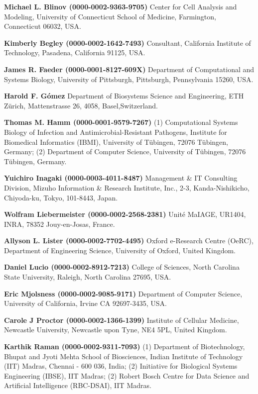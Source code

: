 \documentclass{sbml-paper}
\begin{document}
\textbf{Michael L. Blinov (0000-0002-9363-9705)} Center for Cell Analysis and Modeling, University of Connecticut School of Medicine, Farmington, Connecticut 06032, USA.

\textbf{Kimberly Begley (0000-0002-1642-7493)} Consultant, California Institute of Technology, Pasadena, California 91125, USA.

\textbf{James R. Faeder (0000-0001-8127-609X)} Department of Computational and Systems Biology, University of Pittsburgh, Pittsburgh, Pennsylvania 15260, USA.

\textbf{Harold F. Gómez} Department of Biosystems Science and Engineering, ETH Zürich, Mattenstrasse 26, 4058, Basel,Switzerland.

\textbf{Thomas M. Hamm (0000-0001-9579-7267)} (1) Computational Systems Biology of Infection and Antimicrobial-Resistant Pathogens, Institute for Biomedical Informatics (IBMI), University of Tübingen, 72076 Tübingen, Germany; (2) Department of Computer Science, University of Tübingen, 72076 Tübingen, Germany.

\textbf{Yuichiro Inagaki (0000-0003-4011-8487)} Management & IT Consulting Division, Mizuho Information & Research Institute, Inc., 2-3, Kanda-Nishikicho, Chiyoda-ku, Tokyo, 101-8443, Japan.

\textbf{Wolfram Liebermeister (0000-0002-2568-2381)} Unité MaIAGE, UR1404, INRA, 78352 Jouy-en-Josas, France.

\textbf{Allyson L. Lister (0000-0002-7702-4495)} Oxford e-Research Centre (OeRC), Department of Engineering Science, University of Oxford, United Kingdom.

\textbf{Daniel Lucio (0000-0002-8912-7213)} College of Sciences, North Carolina State University, Raleigh, North Carolina 27695, USA.

\textbf{Eric Mjolsness (0000-0002-9085-9171)} Department of Computer Science, University of California, Irvine CA 92697-3435, USA.

\textbf{Carole J Proctor (0000-0002-1366-1399)} Institute of Cellular Medicine, Newcastle University, Newcastle upon Tyne, NE4 5PL, United Kingdom.

\textbf{Karthik Raman (0000-0002-9311-7093)} (1) Department of Biotechnology, Bhupat and Jyoti Mehta School of Biosciences, Indian Institute of Technology (IIT) Madras, Chennai - 600 036, India; (2) Initiative for Biological Systems Engineering (IBSE), IIT Madras; (2) Robert Bosch Centre for Data Science and Artificial Intelligence (RBC-DSAI), IIT Madras.
\end{document}
